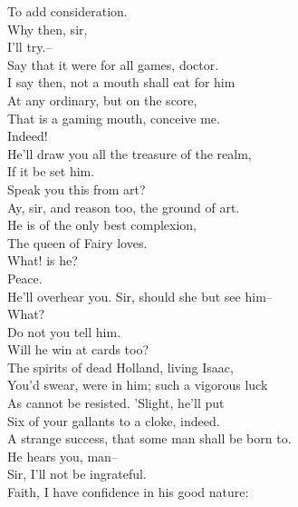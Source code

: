 \documentclass{memoir}
\begin{document}
\begin{drama*}
 To add consideration.\\
\facespeaks {} Why then, sir,\\
 I'll try.--\\
 Say that it were for all games, doctor.\\
\subtlespeaks {} I say then, not a mouth shall eat for him\\
 At any ordinary, but on the score,\\
 That is a gaming mouth, conceive me.\\
\facespeaks {} Indeed!\\
\subtlespeaks  He'll draw you all the treasure of the realm,\\
 If it be set him.\\
\facespeaks {} Speak you this from art?\\
\subtlespeaks  Ay, sir, and reason too, the ground of art.\\
 He is of the only best complexion,\\
 The queen of Fairy loves.\\
\facespeaks {} What! is he?\\
\subtlespeaks {} Peace.\\
 He'll overhear you. Sir, should she but see him--\\
\facespeaks  What?\\
\subtlespeaks {} Do not you tell him.\\
\facespeaks {} Will he win at cards too?\\
\subtlespeaks  The spirits of dead Holland, living Isaac,\\
 You'd swear, were in him; such a vigorous luck\\
 As cannot be resisted. 'Slight, he'll put\\
 Six of your gallants to a cloke, indeed.\\
\facespeaks  A strange success, that some man shall be born to.\\
\subtlespeaks  He hears you, man--\\
\dapperspeaks {} Sir, I'll not be ingrateful.\\
\facespeaks  Faith, I have confidence in his good nature:\\

\end{drama*}
\end{document}
